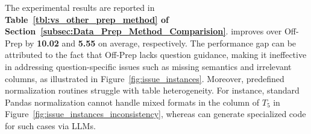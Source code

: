 The experimental results are reported in \textbf{Table~\ref{tbl:vs_other_prep_method} of Section~\ref{subsec:Data_Prep_Method_Comparision}}.
\sys improves over Off-Prep by \textbf{10.02} and \textbf{5.55} on average, respectively.  
The performance gap can be attributed to the fact that Off-Prep lacks question guidance, making it ineffective in addressing question-specific issues such as missing semantics and irrelevant columns, as illustrated in Figure~\ref{fig:issue_instances}.
Moreover, predefined normalization routines struggle with table heterogeneity. For instance, standard Pandas normalization cannot handle mixed formats in the  column of $T_5$ in Figure~\ref{fig:issue_instances_inconsistency}, whereas \sys can generate specialized code for such cases via LLMs.
%


